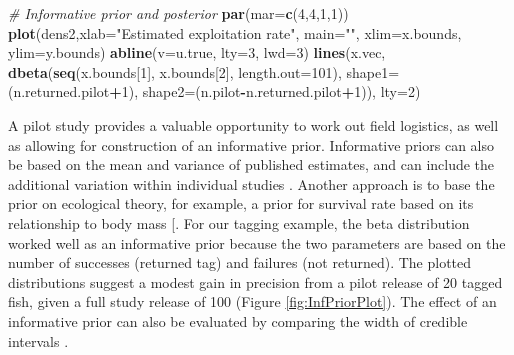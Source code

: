 \documentclass[
]{krantz}
\makeatletter
\newenvironment{Shaded}{\begin{snugshade}}{\end{snugshade}}
\newcommand{\AttributeTok}[1]{\textcolor[rgb]{0.27,0.27,0.27}{#1}}
\newcommand{\CommentTok}[1]{\textcolor[rgb]{0.37,0.37,0.37}{\textit{#1}}}
\newcommand{\DecValTok}[1]{\textcolor[rgb]{0.06,0.06,0.06}{#1}}
\newcommand{\FunctionTok}[1]{\textcolor[rgb]{0.27,0.27,0.27}{\textbf{#1}}}
\newcommand{\NormalTok}[1]{#1}
\newcommand{\SpecialCharTok}[1]{\textcolor[rgb]{0.43,0.43,0.43}{\textbf{#1}}}
\newcommand{\StringTok}[1]{\textcolor[rgb]{0.5,0.5,0.5}{#1}}
\newenvironment{kframe}{%
\medskip{}
\setlength{\fboxsep}{.8em}
 \def\at@end@of@kframe{}%
 \ifinner\ifhmode%
  \def\at@end@of@kframe{\end{minipage}}%
  \begin{minipage}{\columnwidth}%
 \fi\fi%
 \def\FrameCommand##1{\hskip\@totalleftmargin \hskip-\fboxsep
 \colorbox{shadecolor}{##1}\hskip-\fboxsep
     \hskip-\linewidth \hskip-\@totalleftmargin \hskip\columnwidth}%
 \MakeFramed {\advance\hsize-\width
   \@totalleftmargin\z@ \linewidth\hsize
   \@setminipage}}%
 {\par\unskip\endMakeFramed%
 \at@end@of@kframe}
\renewenvironment{Shaded}{\begin{kframe}}{\end{kframe}}
\makeatother
\begin{document}
\begin{Shaded}
\begin{Highlighting}[]
\CommentTok{\# Informative prior and posterior}
\FunctionTok{par}\NormalTok{(}\AttributeTok{mar=}\FunctionTok{c}\NormalTok{(}\DecValTok{4}\NormalTok{,}\DecValTok{4}\NormalTok{,}\DecValTok{1}\NormalTok{,}\DecValTok{1}\NormalTok{))}
\FunctionTok{plot}\NormalTok{(dens2,}\AttributeTok{xlab=}\StringTok{"Estimated exploitation rate"}\NormalTok{, }\AttributeTok{main=}\StringTok{""}\NormalTok{, }
     \AttributeTok{xlim=}\NormalTok{x.bounds, }\AttributeTok{ylim=}\NormalTok{y.bounds)}
\FunctionTok{abline}\NormalTok{(}\AttributeTok{v=}\NormalTok{u.true,  }\AttributeTok{lty=}\DecValTok{3}\NormalTok{, }\AttributeTok{lwd=}\DecValTok{3}\NormalTok{)}
\FunctionTok{lines}\NormalTok{(x.vec, }\FunctionTok{dbeta}\NormalTok{(}\FunctionTok{seq}\NormalTok{(x.bounds[}\DecValTok{1}\NormalTok{], x.bounds[}\DecValTok{2}\NormalTok{], }
                    \AttributeTok{length.out=}\DecValTok{101}\NormalTok{), }\AttributeTok{shape1=}\NormalTok{(n.returned.pilot}\SpecialCharTok{+}\DecValTok{1}\NormalTok{), }
                    \AttributeTok{shape2=}\NormalTok{(n.pilot}\SpecialCharTok{{-}}\NormalTok{n.returned.pilot}\SpecialCharTok{+}\DecValTok{1}\NormalTok{)), }\AttributeTok{lty=}\DecValTok{2}\NormalTok{)}
\end{Highlighting}
\end{Shaded}

A pilot study provides a valuable opportunity to work out field logistics, as well as allowing for construction of an informative prior. Informative priors can also be based on the mean and variance of published estimates, and can include the additional variation within individual studies \citep{mccarthy.masters_2005, regehr.etal_2018}. Another approach is to base the prior on ecological theory, for example, a prior for survival rate based on its relationship to body mass {[}\citep{mccarthy.masters_2005}. For our tagging example, the beta distribution worked well as an informative prior because the two parameters are based on the number of successes (returned tag) and failures (not returned). The plotted distributions suggest a modest gain in precision from a pilot release of 20 tagged fish, given a full study release of 100 (Figure \ref{fig:InfPriorPlot}). The effect of an informative prior can also be evaluated by comparing the width of credible intervals \citep{mccarthy.masters_2005}.
\end{document}
